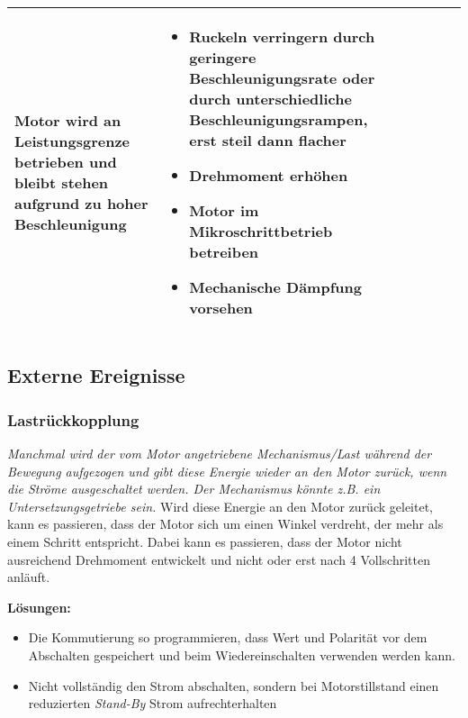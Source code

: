 {{{\begin{center}
\begin{tabularx}{\textwidth}{|X|X|X|X|X|X|}
						Motor wird an Leistungsgrenze betrieben und bleibt stehen aufgrund zu hoher Beschleunigung & 
						\begin{itemize} 
							\item {Ruckeln verringern durch geringere Beschleunigungsrate oder durch unterschiedliche Beschleunigungsrampen, erst steil dann flacher} 
							\item {Drehmoment erhöhen} 
							\item {Motor im Mikroschrittbetrieb betreiben} 
							\item {Mechanische Dämpfung vorsehen} 
						\end{itemize}	 \\	\hline
					\end{tabularx}
					\label{stehenderMotor}
				\end{center}
				
				
				
\subsection{Externe Ereignisse}

\subsubsection{Lastrückkopplung}

				\textit{\glqq Manchmal wird der vom Motor angetriebene Mechanismus/Last während der Bewegung \glqq aufgezogen \grqq und gibt diese Energie wieder an den Motor zurück, wenn die Ströme ausgeschaltet werden. Der Mechanismus könnte z.B. ein Untersetzungsgetriebe sein.\grqq}\cite{FaulhaberDriveSystems.2020} 
				Wird diese Energie an den Motor zurück geleitet, kann es passieren, dass der Motor sich um einen Winkel verdreht, der mehr als einem Schritt entspricht. Dabei kann es passieren, dass der Motor nicht ausreichend Drehmoment entwickelt und nicht oder erst nach 4 Vollschritten anläuft. \cite{FaulhaberDriveSystems.2020}
				
\textbf{Lösungen:}
    \begin{itemize}
					\item Die Kommutierung so programmieren, dass Wert und Polarität vor dem Abschalten gespeichert und beim Wiedereinschalten verwenden werden kann. 
					\item Nicht vollständig den Strom abschalten, sondern bei Motorstillstand einen reduzierten \textit{Stand-By} Strom aufrechterhalten
	\end{itemize}
				
}}}
